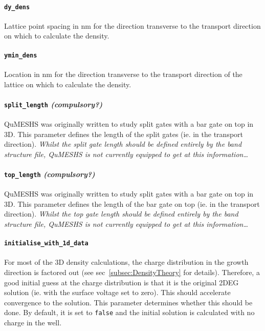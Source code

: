 \documentclass[12pt]{article}
\newcommand{\red}[1]{{\color{red} \it #1}}
\begin{document}
\paragraph{\texttt{dy\_dens}}
Lattice point spacing in nm for the direction transverse to the transport direction on
which to calculate the density.

\paragraph{\texttt{ymin\_dens}}
Location in nm for the direction transverse to the transport direction of the lattice on
which to calculate the density.

\paragraph{\texttt{split\_length} \emph{(compulsory?)}}
QuMESHS was originally written to study split gates with a bar gate on top in 3D.  This
parameter defines the length of the split gates (ie. in the transport direction).
\red{Whilst the split gate length should be defined entirely by the band structure file,
QuMESHS is not currently equipped to get at this information\ldots}

\paragraph{\texttt{top\_length} \emph{(compulsory?)}}
QuMESHS was originally written to study split gates with a bar gate on top in 3D.  This
parameter defines the length of the bar gate on top (ie. in the transport direction).
\red{Whilst the top gate length should be defined entirely by the band structure file,
QuMESHS is not currently equipped to get at this information\ldots}

\paragraph{\texttt{initialise\_with\_1d\_data}}
For most of the 3D density calculations, the charge distribution in the growth direction
is factored out (see sec~\ref{subsec:DensityTheory} for details).  Therefore, a good
initial guess at the charge distribution is that it is the original 2DEG solution (ie.
with the surface voltage set to zero).  This should accelerate convergence to the solution.
This parameter determines whether this should be done.  By default, it is set to
\texttt{false} and the initial solution is calculated with no charge in the well.
\end{document}
